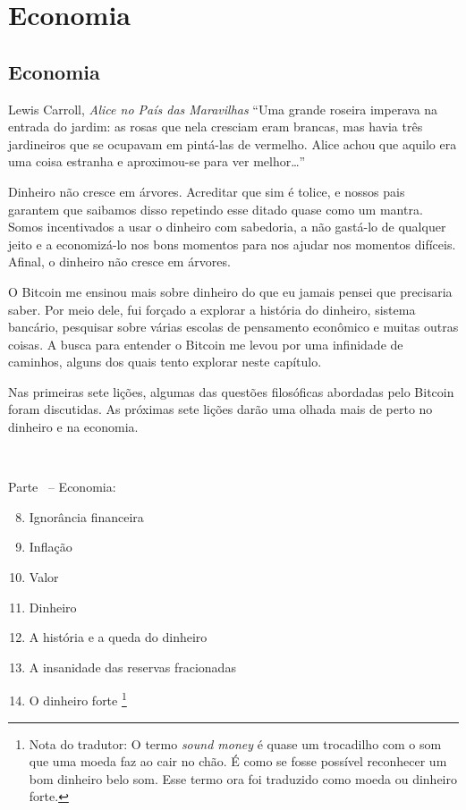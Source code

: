 \part{Economia}
\label{ch:economics}
\chapter*{Economia}

\begin{chapquote}{Lewis Carroll, \textit{Alice no País das Maravilhas}}
\enquote{Uma grande roseira imperava na entrada do jardim: as rosas que nela cresciam eram brancas, mas havia três jardineiros que se ocupavam em pintá-las de vermelho. Alice achou que aquilo era uma coisa estranha e aproximou-se para ver melhor\ldots}
\end{chapquote}

Dinheiro não cresce em árvores. Acreditar que sim é tolice, e nossos pais garantem que saibamos disso repetindo esse ditado quase como um mantra. Somos incentivados a usar o dinheiro com sabedoria, a não gastá-lo de qualquer jeito e a economizá-lo nos bons momentos para nos ajudar nos momentos difíceis. Afinal, o dinheiro não cresce em árvores.

O Bitcoin me ensinou mais sobre dinheiro do que eu jamais pensei que precisaria saber. Por meio dele, fui forçado a explorar a história do dinheiro, sistema bancário, pesquisar sobre várias escolas de pensamento econômico e muitas outras coisas. A busca para entender o Bitcoin me levou por uma infinidade de caminhos, alguns dos quais tento explorar neste capítulo.

Nas primeiras sete lições, algumas das questões filosóficas abordadas pelo Bitcoin foram discutidas. As próximas sete lições darão uma olhada mais de perto no dinheiro e na economia.

~

\begin{samepage}
Parte~\ref{ch:economics} -- Economia:

\begin{enumerate}
  \setcounter{enumi}{7}
  \item Ignorância financeira
  \item Inflação
  \item Valor
  \item Dinheiro
  \item A história e a queda do dinheiro
  \item A insanidade das reservas fracionadas
  \item O dinheiro forte \footnote{Nota do tradutor: O termo \textit{sound money} é quase um trocadilho com o som que uma moeda faz ao cair no chão. É como se fosse possível reconhecer um bom dinheiro belo som. Esse termo ora foi traduzido como moeda ou dinheiro forte. }
\end{enumerate}
\end{samepage}

